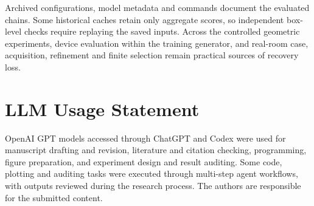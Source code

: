 \documentclass[10pt,twocolumn,letterpaper]{article}
\begin{document}
Archived configurations, model metadata and commands document the
evaluated chains. Some historical caches retain only aggregate scores,
so independent box-level checks require replaying the saved inputs.
Across the controlled geometric experiments, device evaluation within
the training generator, and real-room case, acquisition, refinement and
finite selection remain practical sources of recovery loss.

\FloatBarrier
\section*{LLM Usage Statement}
OpenAI GPT models accessed through ChatGPT and Codex were used for
manuscript drafting and revision, literature and citation checking,
programming, figure preparation, and experiment design and result
auditing. Some code, plotting and auditing tasks were executed through
multi-step agent workflows, with outputs reviewed during the research
process. The authors are responsible for the submitted content.
\end{document}
